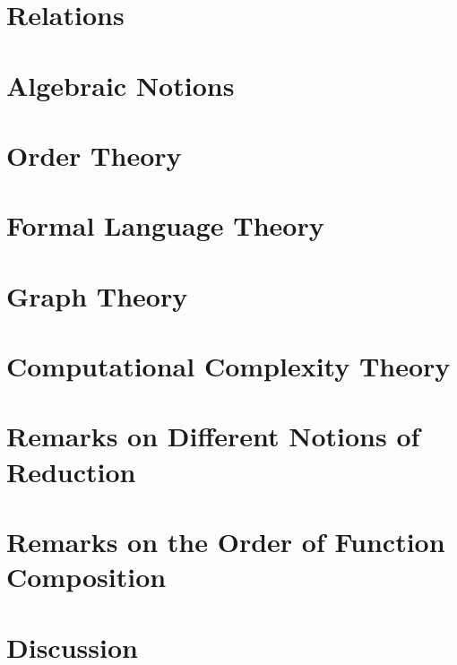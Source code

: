 

\section{Relations}
\label{prelim:sec:relations}



\section{Algebraic Notions}
\label{prelim:sec:algebra}



\section{Order Theory}
\label{prelim:sec:order}



\section{Formal Language Theory}
\label{sec:formal_language_theory}



\section{Graph Theory}
\label{prelim:sec:graphs}



\section{Computational Complexity Theory}
\label{prelim:sec:complexity}



\section{Remarks on Different Notions of Reduction} 
\label{prelim:sec:remarks-reduction}



\section{Remarks on the Order of Function Composition}
\label{prelim:sec:remarks_func_comp} 



\section{Discussion} 
\label{prelim:prelim:discussion}

